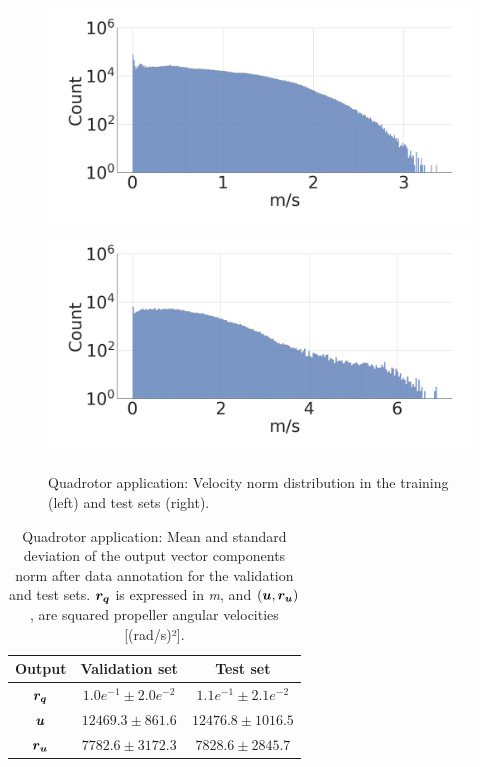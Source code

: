 \begin{figure} [htp]
    \centering
    \includegraphics[width=0.49\linewidth]{figures/learning_quadrotor/vnorm_val2.png}
    \includegraphics[width=0.49\linewidth]{figures/learning_quadrotor/vnorm_test.png}
    \caption{Quadrotor application: Velocity norm distribution in the training (left) and test sets (right).}%
    \label{fig: valvstest}%
\end{figure}

\begin{table}[htp]
    \centering
    \begin{tabular}{ | c | c || c |}
    \hline
      \textbf{Output}  & \textbf{Validation set}  & \textbf{Test set} \\ \hline
    $\boldsymbol{r_q}$ & $1.0e^{-1} \pm 2.0e^{-2}$ & $1.1e^{-1} \pm 2.1e^{-2}$ \\ \hline
    $\boldsymbol{u}$ & $12469.3 \pm 861.6$ & $12476.8 \pm 1016.5$ \\ \hline
    $\boldsymbol{r_u}$ & $7782.6 \pm 3172.3$ & $7828.6 \pm 2845.7$ \\ \hline
\end{tabular}
\caption{
Quadrotor application: Mean and standard deviation of the output vector components norm after data annotation for the validation and test sets.
$\boldsymbol{r_q}$ is expressed in \emph{m}, and $(\boldsymbol{u}, \boldsymbol{r_u})$, are squared propeller angular velocities [(rad/s)²].}
 \label{tab:datas_stats}
\end{table}


